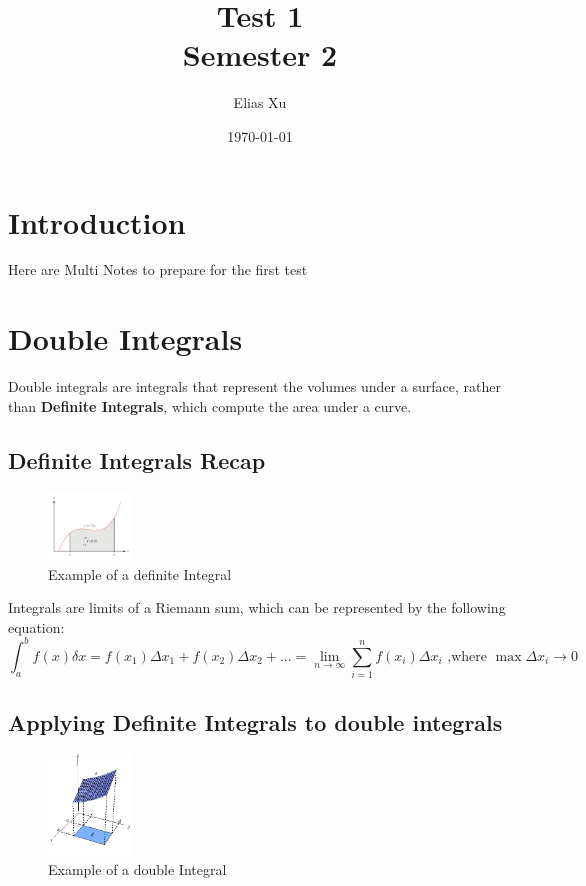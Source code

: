 \documentclass{article}
\begin{document}
\title{Test 1 \\
    Semester 2}
\author{Elias Xu}
\date{\today}
\maketitle

\section{Introduction}

Here are Multi Notes to prepare for the first test

\section{Double Integrals}

Double integrals are integrals that represent the volumes under a surface, rather than \textbf{Definite Integrals}, which compute the area under a curve.

\subsection{Definite Integrals Recap}

\begin{figure}[H]
    \centering
    \includegraphics[width=0.2\textwidth]{images/DefiniteIntegralExample.png}
    \caption{Example of a definite Integral}
\end{figure}


Integrals are limits of a Riemann sum, which can be represented by the following equation:
$$\int_{a}^{b} f(x)\delta x = f(x_1)\Delta x_1 + f(x_2) \Delta x_2 + ... = \lim_{n \to \infty} \sum_{i = 1}^{n} f(x_i) \Delta x_i \text{ ,where } \max \Delta x_i \to 0$$

\subsection{Applying Definite Integrals to double integrals}

\begin{figure}[H]
    \centering
    \includegraphics[width=0.2\textwidth]{images/DoubleIntegralsExample.png}
    \caption{Example of a double Integral}
\end{figure}
\end{document}
